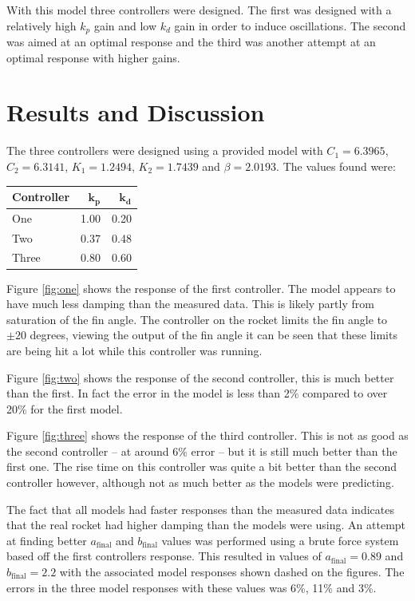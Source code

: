 \documentclass[a4paper,12pt]{article}
\begin{document}
    With this model three controllers were designed.  The first was designed
    with a relatively high $k_p$ gain and low $k_d$ gain in order to induce
    oscillations.  The second was aimed at an optimal response and the third was
    another attempt at an optimal response with higher gains.


  \section{Results and Discussion}

    The three controllers were designed using a provided model with $C_1 =
    6.3965$, $C_2 = 6.3141$, $K_1 = 1.2494$, $K_2 = 1.7439$ and $\beta =
    2.0193$.  The values found were:

    {
      \centering
      \begin{tabular}{l||r|r}
        \textbf{Controller} & $\boldsymbol{k_p}$ & $\boldsymbol{k_d}$ \\
        \hline
        One & 1.00 & 0.20 \\
        Two & 0.37 & 0.48 \\
        Three & 0.80 & 0.60 \\
      \end{tabular}
    }

    Figure \ref{fig:one} shows the response of the first controller.  The model
    appears to have much less damping than the measured data.  This is likely
    partly from saturation of the fin angle.  The controller on the rocket
    limits the fin angle to $\pm 20$ degrees, viewing the output of the fin
    angle it can be seen that these limits are being hit a lot while this
    controller was running.

    Figure \ref{fig:two} shows the response of the second controller, this is
    much better than the first.  In fact the error in the model is less than 2\%
    compared to over 20\% for the first model.

    Figure \ref{fig:three} shows the response of the third controller.  This
    is not as good as the second controller -- at around 6\% error -- but it is
    still much better than the first one.  The rise time on this controller was
    quite a bit better than the second controller however, although not as much
    better as the models were predicting.

    The fact that all models had faster responses than the measured data
    indicates that the real rocket had higher damping than the models were
    using.  An attempt at finding better $a_\text{final}$ and $b_\text{final}$
    values was performed using a brute force system based off the first
    controllers response.  This resulted in values of $a_\text{final} = 0.89$
    and $b_\text{final} = 2.2$ with the associated model responses shown dashed
    on the figures.  The errors in the three model responses with these values
    was 6\%, 11\% and 3\%.
\end{document}
